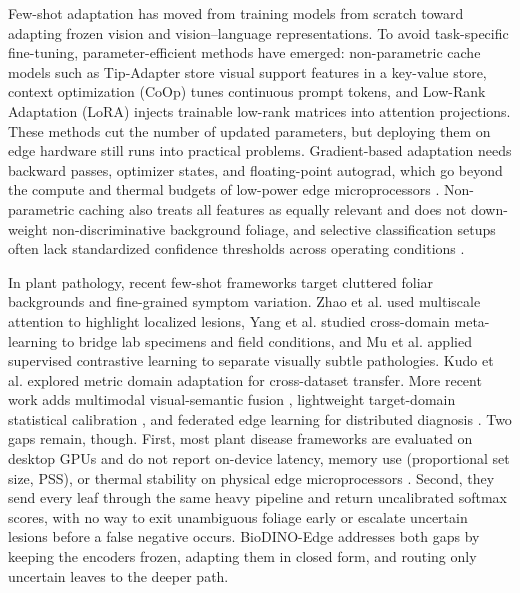 \documentclass[preprint,12pt]{elsarticle}
\begin{document}
Few-shot adaptation has moved from training models from scratch toward adapting frozen vision and vision--language representations. To avoid task-specific fine-tuning, parameter-efficient methods have emerged: non-parametric cache models such as Tip-Adapter \cite{zhang2022tip} store visual support features in a key-value store, context optimization (CoOp) \cite{zhou2022coop} tunes continuous prompt tokens, and Low-Rank Adaptation (LoRA) \cite{hu2022lora} injects trainable low-rank matrices into attention projections. These methods cut the number of updated parameters, but deploying them on edge hardware still runs into practical problems. Gradient-based adaptation needs backward passes, optimizer states, and floating-point autograd, which go beyond the compute and thermal budgets of low-power edge microprocessors \cite{babu2025agrifewnet}. Non-parametric caching also treats all features as equally relevant and does not down-weight non-discriminative background foliage, and selective classification setups often lack standardized confidence thresholds across operating conditions \cite{traub2024overcoming}.

In plant pathology, recent few-shot frameworks target cluttered foliar backgrounds and fine-grained symptom variation. Zhao et al. \cite{zhao2024mafde} used multiscale attention to highlight localized lesions, Yang et al. \cite{yang2024laboratory} studied cross-domain meta-learning to bridge lab specimens and field conditions, and Mu et al. \cite{mu2024few} applied supervised contrastive learning to separate visually subtle pathologies. Kudo et al. \cite{kudo2025few} explored metric domain adaptation for cross-dataset transfer. More recent work adds multimodal visual-semantic fusion \cite{zhou2026vsf}, lightweight target-domain statistical calibration \cite{zhao2026lightweight}, and federated edge learning for distributed diagnosis \cite{sharif2026real}. Two gaps remain, though. First, most plant disease frameworks are evaluated on desktop GPUs and do not report on-device latency, memory use (proportional set size, PSS), or thermal stability on physical edge microprocessors \cite{babu2025agrifewnet}. Second, they send every leaf through the same heavy pipeline and return uncalibrated softmax scores, with no way to exit unambiguous foliage early or escalate uncertain lesions before a false negative occurs. BioDINO-Edge addresses both gaps by keeping the encoders frozen, adapting them in closed form, and routing only uncertain leaves to the deeper path.

\end{document}
